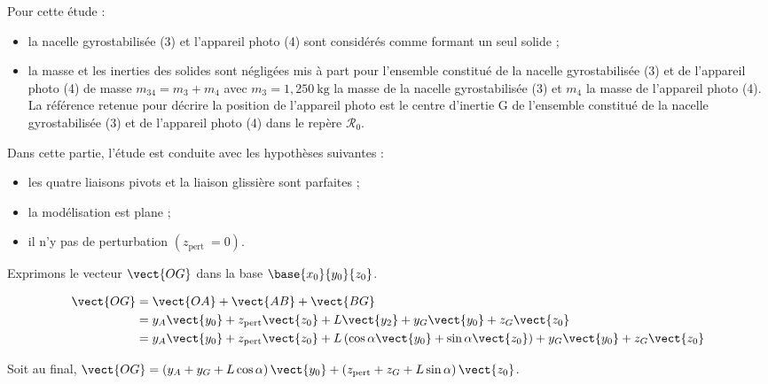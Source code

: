 Pour cette étude :

\begin{itemize}
  \item la nacelle gyrostabilisée (3) et l'appareil photo (4) sont considérés comme formant un seul solide ;
  \item la masse et les inerties des solides sont négligées mis à part pour l'ensemble constitué de la nacelle gyrostabilisée (3) et de l'appareil photo (4) de masse $m_{34}=m_{3}+m_{4}$ avec $m_{3}=1,250 \mathrm{~kg}$ la masse de la nacelle gyrostabilisée (3) et $m_{4}$ la masse de l'appareil photo (4). La référence retenue pour décrire la position de l'appareil photo est le centre d'inertie $\mathrm{G}$ de l'ensemble constitué de la nacelle gyrostabilisée (3) et de l'appareil photo (4) dans le repère $\mathcal{R}_{0}$.

\end{itemize}


Dans cette partie, l'étude est conduite avec les hypothèses suivantes :
\begin{itemize}
  \item les quatre liaisons pivots et la liaison glissière sont parfaites ;
  \item la modélisation est plane ;
  \item il n'y pas de perturbation $\left(z_{\text {pert }}=0\right)$.
\end{itemize}
\fi

\ifprof
\begin{corrige}
Exprimons le vecteur $\vect{OG}$ dans la base $\base{x_0}{y_0}{z_0}$.

\begin{align*}
\vect{OG} &=\vect{OA}+\vect{AB}+\vect{BG} \\
&=y_A\vect{y_0}+z_{\text{pert}}\vect{z_0}+L\vect{y_2}+y_G\vect{y_0}+z_{G}\vect{z_0}\\
&=y_A\vect{y_0}+z_{\text{pert}}\vect{z_0}+L\left(\cos\alpha\vect{y_0}+\sin\alpha\vect{z_0}\right)+y_G\vect{y_0}+z_{G}\vect{z_0}\\
\end{align*}

Soit au final, 
$\vect{OG} =\left(y_A+y_G+L\cos\alpha\right)\vect{y_0}+\left(z_{\text{pert}}+z_{G}+L\sin\alpha\right)\vect{z_0}$.
\end{corrige}
\else
\fi

